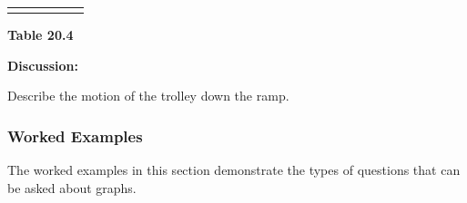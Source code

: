 {\begin{center}
\begin{xtabular*}{\mytablewidth}[t]{|p{10\mystarwidth}|p{10\mystarwidth}|p{10\mystarwidth}|p{10\mystarwidth}|p{10\mystarwidth}|p{10\mystarwidth}|}
    
         &
    
    
         &
    
    
     \tabularnewline{}
    \end{xtabular*}
      \end{center}
    \begin{center}{\small\bfseries Table 20.4}\end{center}
    
    \addtocounter{footnote}{-0}
    
        }%
      
    \par
  
        
        \label{m38795*id7172254}\noindent{}\textbf{Discussion:}
          
Describe the motion of the trolley down the ramp. 
\par \label{m38795*cid9}
            \subsubsection{ Worked Examples}
            \nopagebreak
            
      
      \label{m38795*id73306}The worked examples in this section demonstrate the types of questions that can be asked about graphs.\par 
\label{m38795*secfhsst!!!underscore!!!id3422}\vspace{.5cm} 
      
